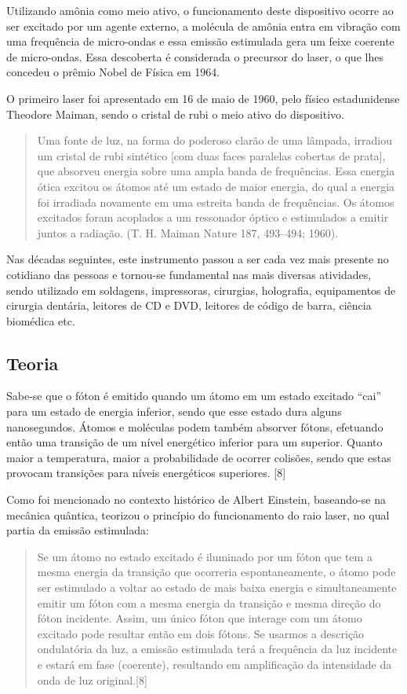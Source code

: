 Utilizando amônia como meio ativo, o funcionamento deste dispositivo ocorre ao ser excitado por um agente externo, a molécula de amônia entra em vibração com uma frequência de micro-ondas e essa emissão estimulada gera um feixe coerente de micro-ondas. Essa descoberta é considerada o precursor do laser, o que lhes concedeu o prêmio Nobel de Física em 1964.

O primeiro laser foi apresentado em 16 de maio de 1960, pelo físico estadunidense Theodore Maiman, sendo o cristal de rubi o meio ativo do dispositivo.

\begin{quote}
Uma fonte de luz, na forma do poderoso clarão de uma lâmpada, irradiou um cristal de rubi sintético [com duas faces paralelas cobertas de prata], que absorveu energia sobre uma ampla banda de frequências. Essa energia ótica excitou os átomos até um estado de maior energia, do qual a energia foi irradiada novamente em uma estreita banda de frequências. Os átomos excitados foram acoplados a um ressonador óptico e estimulados a emitir juntos a radiação. (T. H. Maiman Nature 187, 493–494; 1960).
\end{quote}

Nas décadas seguintes, este instrumento passou a ser cada vez mais presente no cotidiano das pessoas e tornou-se fundamental nas mais diversas atividades, sendo utilizado em soldagens, impressoras, cirurgias, holografia, equipamentos de cirurgia dentária, leitores de CD e DVD, leitores de código de barra, ciência biomédica etc.

\subsection{Teoria}

Sabe-se que o fóton é emitido quando um átomo em um estado excitado ``cai'' para um estado de energia inferior, sendo que esse estado dura alguns nanosegundos. Átomos e moléculas podem também absorver fótons, efetuando então uma transição de um nível energético inferior para um superior. Quanto maior a temperatura, maior a probabilidade de ocorrer colisões, sendo que estas provocam transições para níveis energéticos superiores. [8]

Como foi mencionado no contexto histórico de Albert Einstein, baseando-se na mecânica quântica, teorizou o princípio do funcionamento do raio laser, no qual partia da emissão estimulada:

\begin{quote}
Se um átomo no estado excitado é iluminado por um fóton que tem a mesma energia da transição que ocorreria espontaneamente, o átomo pode ser estimulado a voltar ao estado de mais baixa energia e simultaneamente emitir um fóton com a mesma energia da transição e mesma direção do fóton incidente. Assim, um único fóton que interage com um átomo excitado pode resultar então em dois fótons. Se usarmos a descrição ondulatória da luz, a emissão estimulada terá a frequência da luz incidente e estará em fase (coerente), resultando em amplificação da intensidade da onda de luz original.[8]
\end{quote}

